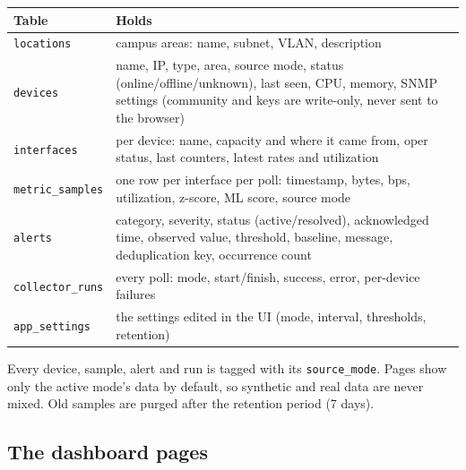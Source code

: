 \documentclass[11pt,a4paper]{article}
\newcommand{\code}[1]{\texttt{#1}}
\begin{document}
\begin{center}
\small
\begin{tabularx}{\linewidth}{@{}l Y@{}}
\toprule
\textbf{Table} & \textbf{Holds} \\
\midrule
\code{locations} & campus areas: name, subnet, VLAN, description \\
\code{devices} & name, IP, type, area, source mode, status (online/offline/unknown), last seen, CPU, memory, SNMP settings
                 (community and keys are write-only, never sent to the browser) \\
\code{interfaces} & per device: name, capacity and where it came from, oper status, last counters, latest rates and utilization \\
\code{metric\_samples} & one row per interface per poll: timestamp, bytes, bps, utilization, z-score, ML score, source mode \\
\code{alerts} & category, severity, status (active/resolved), acknowledged time, observed value, threshold, baseline, message,
                deduplication key, occurrence count \\
\code{collector\_runs} & every poll: mode, start/finish, success, error, per-device failures \\
\code{app\_settings} & the settings edited in the UI (mode, interval, thresholds, retention) \\
\bottomrule
\end{tabularx}
\end{center}

Every device, sample, alert and run is tagged with its \code{source\_mode}. Pages show only the active mode's data by default,
so synthetic and real data are never mixed. Old samples are purged after the retention period (7 days).

\subsection{The dashboard pages}
\end{document}
